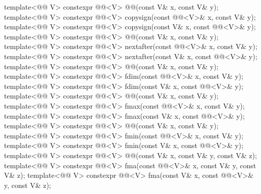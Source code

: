 \begin{itemdecl}
template<@@ V>
  constexpr @@<V> @@(const V& x, const V& y);
template<@@ V>
  constexpr @@<V> copysign(const @@<V>& x, const V& y);
template<@@ V>
  constexpr @@<V> copysign(const V& x, const @@<V>& y);
template<@@ V>
  constexpr @@<V> @@(const V& x, const V& y);
template<@@ V>
  constexpr @@<V> nextafter(const @@<V>& x, const V& y);
template<@@ V>
  constexpr @@<V> nextafter(const V& x, const @@<V>& y);
template<@@ V>
  constexpr @@<V> @@(const V& x, const V& y);
template<@@ V>
  constexpr @@<V> fdim(const @@<V>& x, const V& y);
template<@@ V>
  constexpr @@<V> fdim(const V& x, const @@<V>& y);
template<@@ V>
  constexpr @@<V> @@(const V& x, const V& y);
template<@@ V>
  constexpr @@<V> fmax(const @@<V>& x, const V& y);
template<@@ V>
  constexpr @@<V> fmax(const V& x, const @@<V>& y);
template<@@ V>
  constexpr @@<V> @@(const V& x, const V& y);
template<@@ V>
  constexpr @@<V> fmin(const @@<V>& x, const V& y);
template<@@ V>
  constexpr @@<V> fmin(const V& x, const @@<V>& y);
template<@@ V>
  constexpr @@<V> @@(const V& x, const V& y, const V& z);
template<@@ V>
  constexpr @@<V> fma(const @@<V>& x, const V& y, const V& z);
template<@@ V>
  constexpr @@<V> fma(const V& x, const @@<V>& y, const V& z);

\end{itemdecl}

